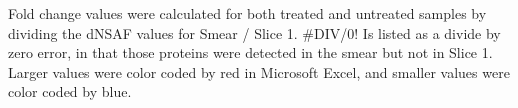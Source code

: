 
\begin{table}
	{Fold change values were calculated for both treated and untreated samples by dividing the dNSAF values for Smear / Slice 1. \#DIV/0! Is listed as a divide by zero error, in that those proteins were detected in the smear but not in Slice 1. Larger values were color coded by red in Microsoft Excel, and smaller values were color coded by blue.}
\begingroup
\let\clearpage\relax
{}
\endgroup
\label{table:heatdatafoldchange}
\end{table}
\clearpage
\FloatBarrier

